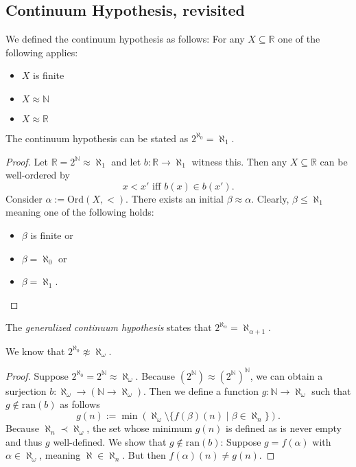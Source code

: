 \documentclass{whrartcl}
\newcommand{\NN}{\mathbb{N}}
\newcommand{\RR}{\mathbb{R}}
\newcommand{\ran}{\text{ran}}
\newcommand{\ord}{\text{Ord}}
\begin{document}
\subsection{Continuum Hypothesis, revisited}

\begin{definition}
  We defined the continuum hypothesis as follows: For any $X \subseteq \RR$ one
  of the following applies:
  \begin{itemize}
  \item $X$ is finite
  \item $X \approx \NN$
  \item $X \approx \RR$
  \end{itemize}
\end{definition}

\begin{lemma}
  The continuum hypothesis can be stated as $2^{\aleph_0} = \aleph_1$.
\end{lemma}
\begin{proof}
  Let $\RR = 2^\NN \approx \aleph_1$ and let $b : \RR \to \aleph_1$ witness
  this. Then any $X \subseteq \RR$ can be well-ordered by
  \[
    x < x' \text{ iff } b(x) \in b(x').
  \]
  Consider $\alpha := \ord(X, <)$. There exists an initial $\beta \approx
  \alpha$. Clearly, $\beta \leq \aleph_1$ meaning one of the following holds:
  \begin{itemize}
  \item $\beta$ is finite or
  \item $\beta = \aleph_0$ or
  \item $\beta = \aleph_1$.
  \end{itemize}
\end{proof}

\begin{definition}
  The \emph{generalized continuum hypothesis} states that $2^{\aleph_\alpha} =
  \aleph_{\alpha + 1}$.
\end{definition}

\begin{theorem}
  We know that $2^{\aleph_0} \not\approx \aleph_\omega$.
\end{theorem}
\begin{proof}
  Suppose $2^{\aleph_0} = 2^\NN \approx \aleph_\omega$. Because $(2^\NN) \approx (2^\NN)^\NN$,
  we can obtain a surjection $b : \aleph_\omega \to (\NN \to \aleph_\omega)$. Then we define
  a function $g : \NN \to \aleph_\omega$ such that $g \not\in \ran(b)$ as
  follows
  \[
    g(n) := \min (\aleph_\omega \setminus \{f(\beta)(n) \mid \beta \in \aleph_n\}).
  \]
  Because $\aleph_n \prec \aleph_\omega$, the set whose minimum $g(n)$ is
  defined as is never empty and thus $g$ well-defined. We show that $g \not\in
  \ran(b)$: Suppose $g = f(\alpha)$ with $\alpha \in \aleph_\omega$, meaning
  $\aleph \in \aleph_n$. But then $f(\alpha)(n) \neq g(n)$.
\end{proof}

\printbibliography{}
\end{document}
